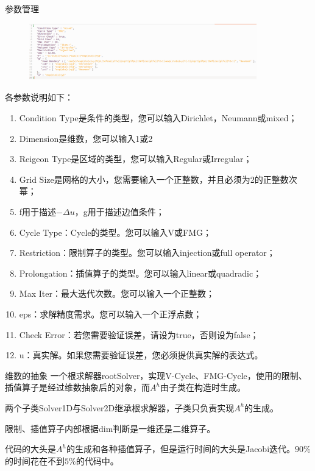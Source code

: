 \documentclass[9pt]{beamer}
\begin{document}
\begin{frame}{参数管理}
\small
\begin{figure}[H]
\centering
\includegraphics[width=0.88\textwidth]{pic/parm.png}
\end{figure}

各参数说明如下：

\begin{enumerate}[(1)]
\item Condition Type是条件的类型，您可以输入Dirichlet，Neumann或mixed；
\item Dimension是维数，您可以输入1或2
\item Reigeon Type是区域的类型，您可以输入Regular或Irregular；
\item Grid Size是网格的大小，您需要输入一个正整数，并且必须为2的正整数次幂；
\item f用于描述$-\Delta u$，g用于描述边值条件；
\item Cycle Type：Cycle的类型。您可以输入V或FMG；
\item Restriction：限制算子的类型。您可以输入injection或full operator；
\item Prolongation：插值算子的类型。您可以输入linear或quadradic；
\item Max Iter：最大迭代次数。您可以输入一个正整数；
\item eps：求解精度需求。您可以输入一个正浮点数；
\item Check Error：若您需要验证误差，请设为true，否则设为false；
\item u：真实解。如果您需要验证误差，您必须提供真实解的表达式。
\end{enumerate}
\end{frame}

\begin{frame}{维数的抽象}
  一个根求解器rootSolver，实现V-Cycle、FMG-Cycle，使用的限制、插值算子是经过维数抽象后的对象，而$A^h$由子类在构造时生成。

  \vspace{1em}
  两个子类Solver1D与Solver2D继承根求解器，子类只负责实现$A^h$的生成。

  \vspace{1em}
  限制、插值算子内部根据dim判断是一维还是二维算子。

  \vspace{1em}
  代码的大头是$A^h$的生成和各种插值算子，但是运行时间的大头是Jacobi迭代。$90\%$的时间花在不到$5\%$的代码中。
\end{frame}
\end{document}
